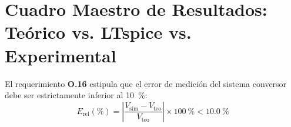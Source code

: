 \documentclass[11pt,letterpaper]{article}
\begin{document}
\section{Cuadro Maestro de Resultados: Teórico vs. LTspice vs. Experimental}

El requerimiento \textbf{O.16} estipula que el error de medición del sistema conversor debe ser estrictamente inferior al \SI{10}{\percent}:
\begin{equation}
E_{\text{rel}}(\%) = \left| \frac{V_{\text{sim}} - V_{\text{teo}}}{V_{\text{teo}}} \right| \times \SI{100}{\percent} < \SI{10.0}{\percent}
\label{eq:error_rel_def}
\end{equation}
\end{document}
